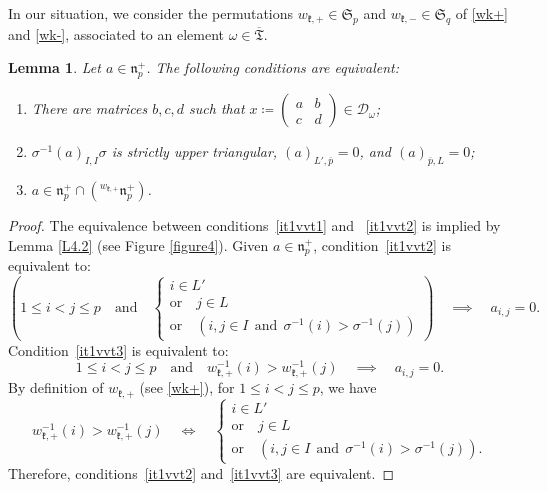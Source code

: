 \documentclass[11pt]{article}
\newtheorem{lemma}[theo]{Lemma}
\theoremstyle{definition}
\numberwithin{equation}{section}
\newcommand{\fk}{\mathfrak{k}}
\newcommand{\fn}{\mathfrak{n}}
\newcommand{\subm}[2]{(#1)_{#2}}
\newcommand{\condir}{\mathcal{D}}
\newcommand{\intp}{\overline{p}}
\newcommand{\permutationsof}[1]{\mathfrak{S}_{#1}}
\newcommand{\ppermutationsof}{\mathfrak{T}}
\newcommand{\parameters}{\overline{\ppermutationsof}}
\begin{document}
In our situation, we consider the permutations $w_{\fk,+}\in\permutationsof{p}$ and $w_{\fk,-}\in\permutationsof{q}$
of \eqref{wk+} and \eqref{wk-}, associated to an element $\omega\in\parameters$.

\begin{lemma}
\label{L4.5}
Let $a\in\fn_p^+$. The following conditions are equivalent:
\begin{enumerate}[label=(\arabic*)]
\item \label{it1vvt1}There are matrices $b,c,d$ such that $x\coloneqq \begin{pmatrix} a & b\\ c & d\end{pmatrix}\in\condir_\omega$;
\item \label{it1vvt2} $\sigma^{-1}\subm{a}{I,I}\sigma$ is strictly upper triangular, $\subm{a}{L',\intp}=0$, and $\subm{a}{\intp,L}=0$;
\item\label{it1vvt3} $a\in \fn_p^+\cap({}^{w_{\fk,+}}\fn_p^+)$.
\end{enumerate}
\end{lemma}

\begin{proof}
The equivalence between conditions~\ref{it1vvt1} and ~\ref{it1vvt2} is implied by Lemma \ref{L4.2} (see Figure \ref{figure4}).
Given $a\in\fn_p^+$, condition~\ref{it1vvt2}  is equivalent to:
\begin{equation*}
\left(1\leq i<j\leq p\quad\mbox{and}\quad\left\{\begin{array}{l}
i\in L'\\ \mbox{or}\quad j\in L\\
\mbox{or}\quad(i,j\in I\ \ \mbox{and}\ \ \sigma^{-1}(i)>\sigma^{-1}(j))
\end{array}\right.\right)
\quad\implies\quad a_{i,j}=0.
\end{equation*}
Condition~\ref{it1vvt3} is equivalent to:
\begin{equation*}
1\leq i<j\leq p\quad \mbox{and}\quad w_{\fk,+}^{-1}(i)> w_{\fk,+}^{-1}(j)\quad \implies\quad  a_{i,j}=0.
\end{equation*}
By definition of $w_{\fk,+}$ (see \eqref{wk+}), for $1\leq i<j\leq p$, we have
\[w_{\fk,+}^{-1}(i)> w_{\fk,+}^{-1}(j)\quad\iff\quad \left\{\begin{array}{l}
i\in L'\\ \mbox{or}\quad j\in L\\
\mbox{or}\quad(i,j\in I\ \ \mbox{and}\ \ \sigma^{-1}(i)>\sigma^{-1}(j)).
\end{array}\right.\]
Therefore, conditions~\ref{it1vvt2} and~\ref{it1vvt3} are equivalent.
\end{proof}
\end{document}
